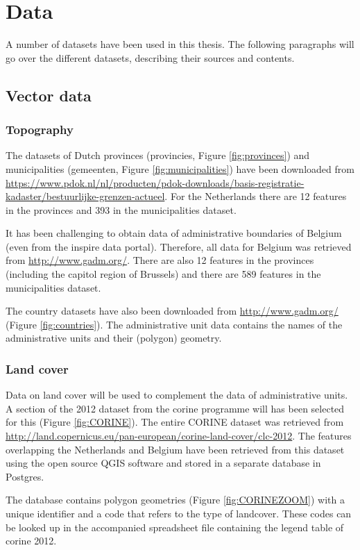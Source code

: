 

\section{Data}
\label{chap:data}

A number of datasets have been used in this thesis. The following paragraphs will go over the different datasets, describing their sources and contents. 

\subsection{Vector data}
\subsubsection{Topography}
\begin{sloppypar}
	The datasets of Dutch provinces (provincies, Figure \ref{fig:provinces}) and municipalities (gemeenten, Figure \ref{fig:municipalities}) have been downloaded from \url{https://www.pdok.nl/nl/producten/pdok-downloads/basis-registratie-kadaster/bestuurlijke-grenzen-actueel}. For the Netherlands there are 12 features in the provinces and 393 in the municipalities dataset. 
	
	It has been challenging to obtain data of administrative boundaries of Belgium (even from the \ac{inspire} data portal). Therefore, all data for Belgium was retrieved from \url{http://www.gadm.org/}. There are also 12 features in the provinces (including the capitol region of Brussels) and there are 589 features in the municipalities dataset.  
	
	The country datasets have also been downloaded from \url{http://www.gadm.org/} (Figure \ref{fig:countries}). The administrative unit data contains the names of the administrative units and their (polygon) geometry. 
\end{sloppypar}

\subsubsection{Land cover}
\begin{sloppypar}
	Data on land cover will be used to complement the data of administrative units. A section of the 2012 dataset from the \ac{corine} programme will has been selected for this (Figure \ref{fig:CORINE}). The entire CORINE dataset was retrieved from \url{http://land.copernicus.eu/pan-european/corine-land-cover/clc-2012}. The features overlapping the Netherlands and Belgium have been retrieved from this dataset using the open source QGIS software and stored in a separate database in Postgres. 
	
	The database contains polygon geometries (Figure \ref{fig:CORINEZOOM}) with a unique identifier and a code that refers to the type of landcover. These codes can be looked up in the accompanied spreadsheet file containing the legend table of \ac{corine} 2012.  	
\end{sloppypar}

